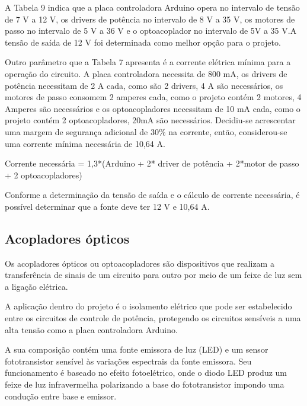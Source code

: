 A Tabela 9 indica que a placa controladora Arduino opera no intervalo de tensão de 7 V a 12 V, 
os drivers de potência no intervalo de 8 V a 35 V, os motores de passo no intervalo de 5 V a 36 V 
e o optoacoplador no intervalo de 5V a 35 V.A tensão de saída de 12 V foi determinada como melhor 
opção para o projeto.

Outro parâmetro que a Tabela 7 apresenta é a corrente elétrica mínima para a operação do circuito. 
A placa controladora necessita de 800 mA, os drivers de potência necessitam de 2 A cada, como são 2 drivers, 
4 A são necessários, os motores de passo consomem 2 amperes cada, como o projeto contém 2 motores, 4 Amperes 
são necessários e os optoacopladores necessitam de 10 mA cada, como o projeto contém 2 optoacopladores, 
20mA são necessários. Decidiu-se acrescentar uma margem de segurança adicional de 30\% na corrente, 
então, considerou-se uma corrente mínima necessária de 10,64 A.

Corrente necessária = 1,3*(Arduino + 2* driver de potência + 2*motor de passo + 2 optoacopladores)

Conforme a determinação da tensão de saída e o cálculo de corrente necessária, 
é possível determinar que a fonte deve ter 12 V e 10,64 A.


\subsection{Acopladores ópticos}

Os acopladores ópticos ou optoacopladores são dispositivos que realizam a transferência de 
sinais de um circuito para outro por meio de um feixe de luz sem a ligação elétrica.

A aplicação dentro do projeto é o isolamento elétrico que pode ser estabelecido entre 
os circuitos de controle de potência, protegendo os circuitos sensíveis a uma alta tensão 
como a placa controladora Arduino.


A sua composição contém uma fonte emissora de luz (LED) e um sensor fototransistor sensível às variações 
espectrais da fonte emissora. Seu funcionamento é baseado no efeito fotoelétrico, onde o diodo LED produz 
um feixe de luz infravermelha polarizando a base do fototransistor impondo uma condução entre base e emissor.

